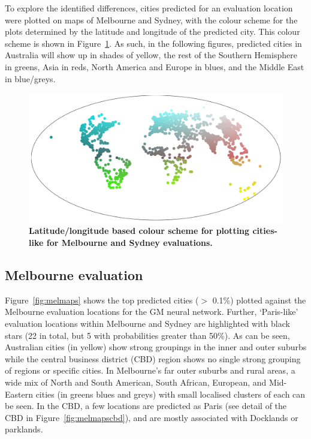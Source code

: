 \documentclass[Crown,sageh,times]{sagej}
\begin{document}
To explore the identified differences, cities predicted for an evaluation location were plotted on maps of Melbourne and Sydney, with the colour scheme for the plots determined by the latitude and longitude of the predicted city. This colour scheme is shown in Figure~\ref{fig:colorscheme}.  As such, in the following figures, predicted cities in Australia will show up in shades of yellow, the rest of the Southern Hemisphere in greens, Asia in reds, North America and Europe in blues, and the Middle East in blue/greys.



\begin{figure}[!htbp]
\centering    
\includegraphics[scale=0.25]{Images/PlosOne/Fig5.png} 
\caption{\bf Latitude/longitude based colour scheme for plotting cities-like for Melbourne and Sydney evaluations.}    
 \label{fig:colorscheme}  
\end{figure} 



\subsection{Melbourne evaluation} 

Figure~\ref{fig:melmaps} shows the top predicted cities ($>$ 0.1\%) plotted against the Melbourne evaluation locations for the GM neural network. Further, `Paris-like' evaluation locations within Melbourne and Sydney are highlighted with black stars (22 in total, but 5 with probabilities greater than 50\%). As can be seen, Australian cities (in yellow) show strong groupings in the inner and outer suburbs while the central business district (CBD) region shows no single strong grouping of regions or specific cities. In Melbourne's far outer suburbs and rural areas, a wide mix of North and South American, South African, European, and Mid-Eastern cities (in greens blues and greys) with small localised clusters of each can be seen. In the CBD, a few locations are predicted as Paris (see detail of the CBD in Figure~\ref{fig:melmapscbd}), and are mostly associated with Docklands or parklands.
\end{document}
